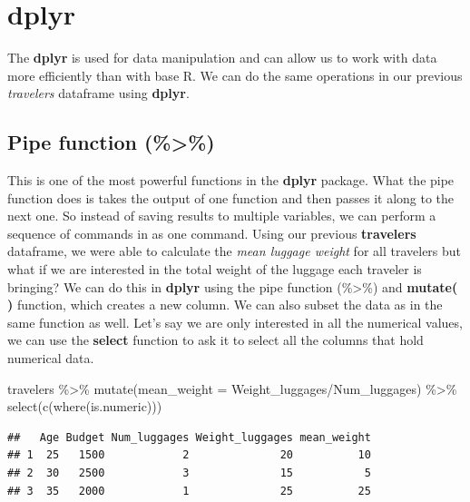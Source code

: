 \documentclass[
]{book}
\newenvironment{Shaded}{\begin{snugshade}}{\end{snugshade}}
\newcommand{\AttributeTok}[1]{\textcolor[rgb]{0.77,0.63,0.00}{#1}}
\newcommand{\FunctionTok}[1]{\textcolor[rgb]{0.00,0.00,0.00}{#1}}
\newcommand{\NormalTok}[1]{#1}
\newcommand{\SpecialCharTok}[1]{\textcolor[rgb]{0.00,0.00,0.00}{#1}}
\begin{document}
\hypertarget{dplyr}{%
\section{dplyr}\label{dplyr}}

The \textbf{dplyr} is used for data manipulation and can allow us to work with data more efficiently than with base R. We can do the same operations in our previous \emph{travelers} dataframe using \textbf{dplyr}.

\hypertarget{pipe-function}{%
\subsection{Pipe function (\%\textgreater\%)}\label{pipe-function}}

This is one of the most powerful functions in the \textbf{dplyr} package. What the pipe function does is takes the output of one function and then passes it along to the next one. So instead of saving results to multiple variables, we can perform a sequence of commands in as one command. Using our previous \textbf{travelers} dataframe, we were able to calculate the \emph{mean luggage weight} for all travelers but what if we are interested in the total weight of the luggage each traveler is bringing? We can do this in \textbf{dplyr} using the pipe function (\%\textgreater\%) and \textbf{mutate( )} function, which creates a new column. We can also subset the data as in the same function as well. Let's say we are only interested in all the numerical values, we can use the \textbf{select} function to ask it to select all the columns that hold numerical data.

\begin{Shaded}
\begin{Highlighting}[]
\NormalTok{travelers }\SpecialCharTok{\%\textgreater{}\%}
  \FunctionTok{mutate}\NormalTok{(}\AttributeTok{mean\_weight =}\NormalTok{ Weight\_luggages}\SpecialCharTok{/}\NormalTok{Num\_luggages) }\SpecialCharTok{\%\textgreater{}\%}
  \FunctionTok{select}\NormalTok{(}\FunctionTok{c}\NormalTok{(}\FunctionTok{where}\NormalTok{(is.numeric)))}
\end{Highlighting}
\end{Shaded}

\begin{verbatim}
##   Age Budget Num_luggages Weight_luggages mean_weight
## 1  25   1500            2              20          10
## 2  30   2500            3              15           5
## 3  35   2000            1              25          25
\end{verbatim}
\end{document}
